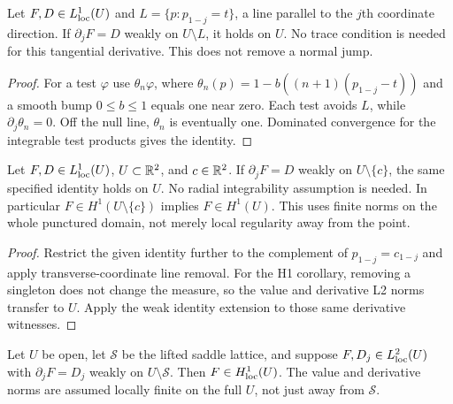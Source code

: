 \begin{lemma}
\label{lem:weak-transverse-line-removal}
\leanok
Let $F,D\in L^1_{\rm loc}(U)$ and
$L=\{p:p_{1-j}=t\}$, a line parallel to the $j$th coordinate direction.
If $\partial_jF=D$ weakly on $U\setminus L$, it holds on $U$.
No trace condition is needed for this tangential derivative.
This does not remove a normal jump.
\end{lemma}

\begin{proof}
\leanok
For a test $\varphi$ use $\theta_n\varphi$, where
$\theta_n(p)=1-b((n+1)(p_{1-j}-t))$ and a smooth bump
$0\le b\le1$ equals one near zero.
Each test avoids $L$, while $\partial_j\theta_n=0$.
Off the null line, $\theta_n$ is eventually one.
Dominated convergence for the integrable test products gives the identity.
\end{proof}

\begin{lemma}
\label{lem:weak-point-removal}
\leanok
Let $F,D\in L^1_{\rm loc}(U)$, $U\subset\mathbb{R}^2$, and $c\in\mathbb{R}^2$.
If $\partial_jF=D$ weakly on $U\setminus\{c\}$, the same specified
identity holds on $U$. No radial integrability assumption is needed.
In particular $F\in H^1(U\setminus\{c\})$ implies $F\in H^1(U)$.
This uses finite norms on the whole punctured domain, not merely local
regularity away from the point.
\end{lemma}

\begin{proof}
\leanok
Restrict the given identity further to the complement of
$p_{1-j}=c_{1-j}$ and apply transverse-coordinate line removal.
For the H1 corollary, removing a singleton does not change the measure,
so the value and derivative L2 norms transfer to $U$. Apply the weak identity
extension to those same derivative witnesses.
\end{proof}

\begin{lemma}
\label{lem:saddle-set-h1-removal}
\leanok
Let $U$ be open, let $\mathcal S$ be the lifted saddle lattice, and suppose
$F,D_j\in L^2_{\rm loc}(U)$ with
$\partial_jF=D_j$ weakly on $U\setminus\mathcal S$.
Then $F\in H^1_{\rm loc}(U)$.
The value and derivative norms are assumed locally finite on the full $U$,
not just away from $\mathcal S$.
\end{lemma}

